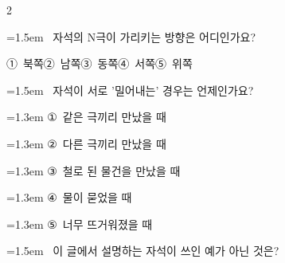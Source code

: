 \documentclass[12pt, a4paper]{article}
\begin{document}
\begin{multicols}{2}
\noindent\begin{minipage}{\columnwidth}
\vspace{2mm}
{\hangindent=1.5em  ~자석의 N극이 가리키는 방향은 어디인가요?\par}

\vspace{0.5mm}
\noindent
\mbox{①~북쪽}\hspace{1em}\mbox{②~남쪽}\hspace{1em}\mbox{③~동쪽}\hspace{1em}\mbox{④~서쪽}\hspace{1em}\mbox{⑤~위쪽}

\vspace{4mm}
\end{minipage}
\par

\noindent\begin{minipage}{\columnwidth}
\vspace{2mm}
{\hangindent=1.5em  ~자석이 서로 '밀어내는' 경우는 언제인가요?\par}

\vspace{0.5mm}
{\hangindent=1.3em  \noindent\hspace{0.3em}①~같은 극끼리 만났을 때\par}
{\hangindent=1.3em  \noindent\hspace{0.3em}②~다른 극끼리 만났을 때\par}
{\hangindent=1.3em  \noindent\hspace{0.3em}③~철로 된 물건을 만났을 때\par}
{\hangindent=1.3em  \noindent\hspace{0.3em}④~물이 묻었을 때\par}
{\hangindent=1.3em  \noindent\hspace{0.3em}⑤~너무 뜨거워졌을 때\par}
\vspace{4mm}
\end{minipage}
\par

\noindent\begin{minipage}{\columnwidth}
\vspace{2mm}
{\hangindent=1.5em  ~이 글에서 설명하는 자석이 쓰인 예가 아닌 것은?\par}


\end{minipage}
\end{multicols}
\end{document}

